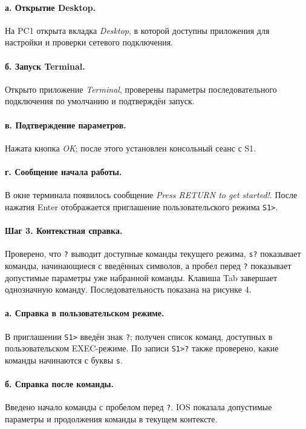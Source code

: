 \documentclass[a4paper,14pt,oneside]{extarticle}
\begin{document}
\paragraph{а. Открытие Desktop.}
На PC1 открыта вкладка \textit{Desktop}, в которой доступны приложения
для настройки и проверки сетевого подключения.

\paragraph{б. Запуск Terminal.}
Открыто приложение \textit{Terminal}, проверены параметры последовательного
подключения по умолчанию и подтверждён запуск.

\paragraph{в. Подтверждение параметров.}
Нажата кнопка \textit{OK}; после этого установлен консольный сеанс с S1.

\paragraph{г. Сообщение начала работы.}
В окне терминала появилось сообщение \textit{Press RETURN to get started!}.
После нажатия Enter отображается приглашение пользовательского режима
\texttt{S1>}.

\paragraph{Шаг 3. Контекстная справка.}
Проверено, что \texttt{?} выводит доступные команды текущего режима,
\texttt{s?} показывает команды, начинающиеся с введённых символов, а пробел
перед \texttt{?} показывает допустимые параметры уже набранной команды.
Клавиша Tab завершает однозначную команду. Последовательность показана на
рисунке 4.

\paragraph{а. Справка в пользовательском режиме.}
В приглашении \texttt{S1>} введён знак \texttt{?}; получен список команд,
доступных в пользовательском EXEC-режиме. По записи \texttt{S1>?} также
проверено, какие команды начинаются с буквы \texttt{s}.

\paragraph{б. Справка после команды.}
Введено начало команды с пробелом перед \texttt{?}. IOS показала допустимые
параметры и продолжения команды в текущем контексте.
\end{document}
